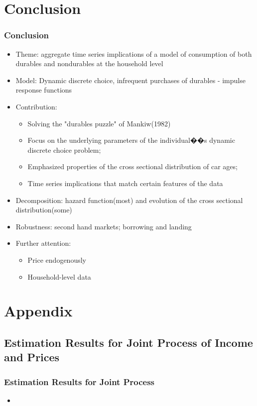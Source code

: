\documentclass{beamer}
\begin{document}
\section{Conclusion}
\begin{frame}
\frametitle{Conclusion}
\begin{itemize}
\item Theme: aggregate time series implications of a model of consumption of both durables and nondurables at the household level
\item Model: Dynamic discrete choice, infrequent purchases of durables - impulse response functions
\item Contribution: 
\begin{itemize}
\item Solving the "durables puzzle" of Mankiw(1982)
\item Focus on the underlying parameters of the individual��s dynamic discrete choice problem; 
\item Emphasized properties of the cross sectional distribution of car ages; 
\item Time series implications that match certain features of the data
\end{itemize}
\item Decomposition: hazard function(most) and evolution of the cross sectional distribution(some)
\item Robustness: second hand markets; borrowing and landing
\item Further attention:
\begin{itemize}
\item Price endogenously
\item Household-level data
\end{itemize}
\end{itemize}
\end{frame}

\section{Appendix}
\subsection{Estimation Results for Joint Process of Income and Prices}
\begin{frame}
\frametitle{Estimation Results for Joint Process}
\begin{itemize}
\item
\end{itemize}
\end{frame}
\end{document}
